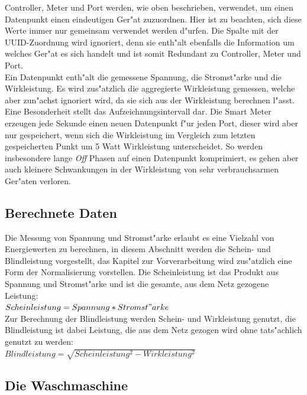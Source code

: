 Controller, Meter und Port werden, wie oben beschrieben, verwendet, um einen Datenpunkt einen eindeutigen Ger"at zuzuordnen. Hier ist zu beachten, sich diese Werte immer nur gemeinsam verwendet werden d"urfen.
Die Spalte mit der UUID-Zuordnung wird ignoriert, denn sie enth"alt ebenfalls die Information um welches Ger"at es sich handelt und ist somit Redundant zu Controller, Meter und Port. \\
Ein Datenpunkt enth"alt die gemessene Spannung, die Stromst"arke und die Wirkleistung. Es wird zus"atzlich die aggregierte Wirkleistung gemessen, welche aber zun"achst ignoriert wird, da sie sich aus der Wirkleistung berechnen l"asst. \\
Eine Besonderheit stellt das Aufzeichnungsintervall dar. Die Smart Meter erzeugen jede Sekunde einen neuen Datenpunkt f"ur jeden Port, dieser wird aber nur gespeichert, wenn sich die Wirkleistung im Vergleich zum letzten gespeicherten Punkt um 5 Watt Wirkleistung unterscheidet. So werden insbesondere lange \textit{Off} Phasen auf einen Datenpunkt komprimiert, es gehen aber auch kleinere Schwankungen in der Wirkleistung von sehr verbrauchsarmen Ger"aten verloren.


\subsection{Berechnete Daten}
\label{Berechnete Daten}

Die Messung von Spannung und Stromst"arke erlaubt es eine Vielzahl von Energiewerten zu berechnen, in diesem Abschnitt werden die Schein- und Blindleistung vorgestellt, das Kapitel zur Vorverarbeitung wird zus"atzlich eine Form der Normalisierung vorstellen. 
Die Scheinleistung ist das Produkt aus Spannung und Stromst"arke und ist die gesamte, aus dem Netz gezogene Leistung:\\ $Scheinleistung = Spannung * Stromst"arke$\\[0.5cm]
Zur Berechnung der Blindleistung werden Schein- und Wirkleistung genutzt, die Blindleistung ist dabei Leistung, die aus dem Netz gezogen wird ohne tats"achlich genutzt zu werden:\\ $Blindleistung = \sqrt{Scheinleistung^2 - Wirkleistung^2}$ \\


\subsection{Die Waschmaschine}
\label{Die Waschmaschine}

